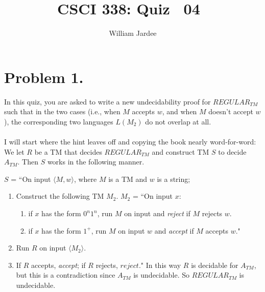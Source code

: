 \documentclass[11pt]{article}
\title{CSCI 338: Quiz ~04~}
\author{William Jardee}
\date{}
\begin{document}
\maketitle

\section*{Problem 1.}

In this quiz, you are asked to write a new undecidability proof for $REGULAR_{TM}$ such that in the two cases (i.e., when $M$ accepts $w$, and when $M$ doesn't accept $w$), the corresponding two languages $L(M_2)$ do not overlap at all.\\\\

I will start where the hint leaves off and copying the book nearly word-for-word:\\

We let $R$ be a TM that decides $REGULAR_{TM}$ and construct TM $S$ to decide $A_{TM}$. Then $S$ works in the following manner. 

$S$ = ``On input $\langle M, w\rangle$, where $M$ is a TM and $w$ is a string;
\begin{enumerate}
    \item Construct the following TM $M_2$.
               $M_2$ = ``On input $x$: 
               \begin{enumerate}
                   \item if $x$ has the form $0^n1^n$, run $M$ on input and \emph{reject} if $M$ rejects $w$.
                   \item if $x$ has the form $1^+$, run $M$ on input $w$ and \emph{accept} if $M$ accepts $w$."
               \end{enumerate}
    \item Run $R$ on input $\langle M_2 \rangle$.
    \item If $R$ accepts, \emph{accept}; if $R$ rejects, $reject$."
    In this way $R$ is decidable for $A_{TM}$, but this is a contradiction since $A_{TM}$ is undecidable. So $REGULAR_{TM}$ is undecidable. 
\end{enumerate}
\end{document}

